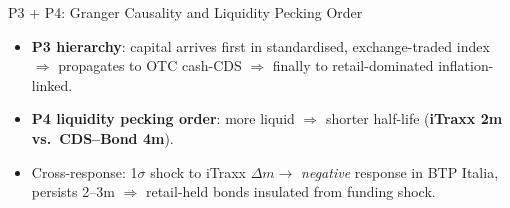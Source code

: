 \documentclass[aspectratio=169,11pt]{beamer}
\newcommand{\hlt}[1]{\textcolor{edhecred}{\textbf{#1}}}     %
\begin{document}
\begin{frame}[t]{P3 + P4: Granger Causality and Liquidity Pecking Order}
\vspace{0.20cm}

\begin{itemize}\itemsep=0.04cm\footnotesize
  \item \hlt{P3 hierarchy}: capital arrives first in standardised, exchange-traded index
        $\Rightarrow$ propagates to OTC cash-CDS $\Rightarrow$ finally to retail-dominated inflation-linked.
  \item \hlt{P4 liquidity pecking order}: more liquid $\Rightarrow$ shorter half-life
        (\hlt{iTraxx 2m vs.\ CDS--Bond 4m}).
  \item Cross-response: 1$\sigma$ shock to iTraxx $\Delta m \to$ \emph{negative} response in BTP Italia,
        persists 2--3m $\Rightarrow$ retail-held bonds insulated from funding shock.
\end{itemize}

\end{frame}
\end{document}
